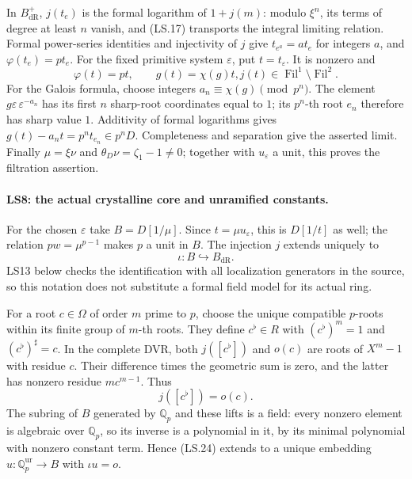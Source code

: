 In $B_{\mathrm{dR}}^+$, $j(t_e)$ is the formal logarithm of
$1+j(m)$: modulo $\xi^n$, its terms of degree at least $n$
vanish, and (LS.17) transports the integral limiting relation.
Formal power-series identities and injectivity of $j$ give
$t_{e^a}=a t_e$ for integers $a$, and $\varphi(t_e)=pt_e$.
For the fixed primitive system $\varepsilon$, put $t=t_\varepsilon$.
It is nonzero and
\[
       \varphi(t)=pt,\qquad g(t)=\chi(g)t,
       j(t)\in\operatorname{Fil}^1\setminus\operatorname{Fil}^2.
 \tag{LS.22}
\]
For the Galois formula, choose integers $a_n\equiv\chi(g)\pmod{p^n}$.
The element $g\varepsilon\,\varepsilon^{-a_n}$ has its first
$n$ sharp-root coordinates equal to $1$; its $p^n$-th root $e_n$
therefore has sharp value $1$. Additivity of formal logarithms gives
$g(t)-a_nt=p^nt_{e_n}\in p^nD$. Completeness and separation give
the asserted limit. Finally $\mu=\xi\nu$ and
$\theta_D\nu=\zeta_1-1\ne0$; together with $u_\varepsilon$ a unit,
this proves the filtration assertion.

\paragraph{LS8: the actual crystalline core and unramified constants.}
For the chosen $\varepsilon$ take $B=D[1/\mu]$.
Since $t=\mu u_\varepsilon$, this is $D[1/t]$ as well;
the relation $pw=\mu^{p-1}$ makes $p$ a unit in $B$.
The injection $j$ extends uniquely to
\[
                    \iota:B\hookrightarrow B_{\mathrm{dR}}. \tag{LS.23}
\]
LS13 below checks the identification with all localization generators
in the source, so this notation does not substitute a formal field
model for its actual ring.

For a root $c\in\Omega$ of order $m$ prime to $p$, choose the unique
compatible $p$-roots within its finite group of $m$-th roots. They
define $c^\flat\in R$ with $(c^\flat)^m=1$ and
$(c^\flat)^\sharp=c$. In the complete DVR, both
$j([c^\flat])$ and $o(c)$ are roots of $X^m-1$ with residue $c$.
Their difference times the geometric sum is zero, and the latter
has nonzero residue $mc^{m-1}$. Thus
\[
                       j([c^\flat])=o(c).          \tag{LS.24}
\]
The subring of $B$ generated by $\mathbb Q_p$ and these lifts is a
field: every nonzero element is algebraic over $\mathbb Q_p$, so
its inverse is a polynomial in it, by its minimal polynomial with
nonzero constant term. Hence (LS.24) extends to a unique embedding
$u:\mathbb Q_p^{\mathrm{ur}}\to B$ with $\iota u=o$.

